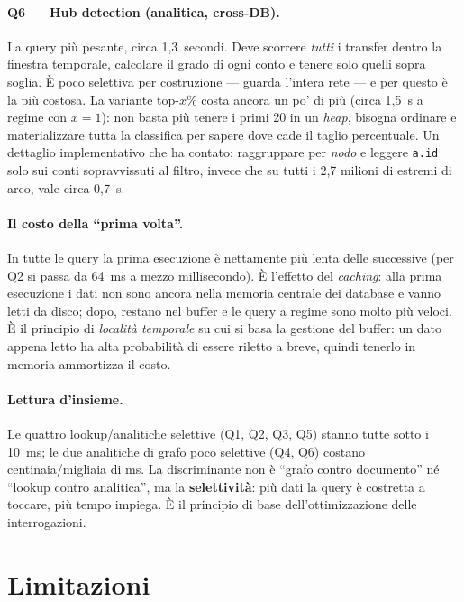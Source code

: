 \documentclass[11pt,a4paper]{article}
\begin{document}
\paragraph{Q6 --- Hub detection (analitica, cross-DB).} La query pi\`u pesante,
circa 1,3~secondi. Deve scorrere \emph{tutti} i transfer dentro la finestra
temporale, calcolare il grado di ogni conto e tenere
solo quelli sopra soglia. \`E poco selettiva per costruzione --- guarda l'intera
rete --- e per questo \`e la pi\`u costosa. La variante top-$x\%$ costa ancora
un po' di pi\`u (circa 1,5~s a regime con $x=1$): non basta pi\`u tenere i
primi 20 in un \emph{heap}, bisogna ordinare e materializzare tutta la
classifica per sapere dove cade il taglio percentuale. Un dettaglio
implementativo che ha contato: raggruppare per \emph{nodo} e leggere
\texttt{a.id} solo sui conti sopravvissuti al filtro, invece che su tutti i
2,7 milioni di estremi di arco, vale circa 0,7~s.

\paragraph{Il costo della ``prima volta''.} In tutte le query la prima
esecuzione \`e nettamente pi\`u lenta delle successive (per Q2 si passa da 64~ms
a mezzo millisecondo). \`E l'effetto del \emph{caching}: alla prima esecuzione i
dati non sono ancora nella memoria centrale dei database e vanno letti da disco;
dopo, restano nel buffer e le query a regime sono molto pi\`u veloci. \`E il
principio di \emph{localit\`a temporale} su cui si basa la gestione del buffer:
un dato appena letto ha alta probabilit\`a di essere riletto a breve, quindi
tenerlo in memoria ammortizza il costo.

\paragraph{Lettura d'insieme.} Le quattro lookup/analitiche selettive (Q1, Q2,
Q3, Q5) stanno tutte sotto i 10~ms; le due analitiche di grafo poco selettive
(Q4, Q6) costano centinaia/migliaia di ms. La discriminante non \`e ``grafo
contro documento'' n\'e ``lookup contro analitica'', ma la \textbf{selettivit\`a}:
pi\`u dati la query \`e costretta a toccare, pi\`u tempo impiega. \`E il principio
di base dell'ottimizzazione delle interrogazioni.

\section{Limitazioni}
\end{document}

